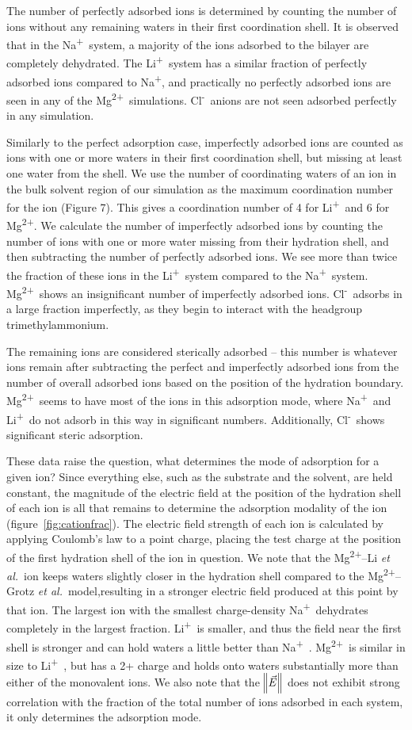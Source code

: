 \documentclass[journal=langd5,manuscript=article]{achemso}
\newcommand{\etal}{\textit{et al.}~}
\newcommand{\na}{Na\textsuperscript{+}~}
\newcommand{\cl}{Cl\textsuperscript{-}~}
\newcommand{\li}{Li\textsuperscript{+}~}
\newcommand{\mg}{Mg\textsuperscript{2+}~}
\newcommand{\mgmbnbfix}{Mg\textsuperscript{2+}--Li \etal} %
\newcommand{\mgmicro}{Mg\textsuperscript{2+}--Grotz \etal}
\begin{document}
The number of perfectly adsorbed ions is determined by counting the number of ions without any remaining 
waters in their first coordination shell. It is observed that in the \na system, a 
majority of the ions adsorbed to the bilayer are completely dehydrated. %
The \li system has a similar fraction of perfectly adsorbed ions compared to Na\textsuperscript{+}, 
and practically no perfectly adsorbed 
ions are seen in any of the \mg simulations. \cl anions are not seen adsorbed perfectly in any simulation.

Similarly to the perfect adsorption case, imperfectly adsorbed ions are counted as ions with one or more waters in their 
first coordination shell, but missing at least one
water from the shell. {We use the number of coordinating waters of an ion in the bulk solvent region
    of our simulation as the maximum coordination number for the ion (Figure 7). This
gives a coordination number of 4 for \li and 6 for 
Mg\textsuperscript{2+}.} We calculate 
{the number of imperfectly adsorbed ions} by counting the number of ions with 
one or more water missing from their hydration shell, and then subtracting the number of perfectly adsorbed ions.
We see more than twice the fraction of these ions in the \li system compared to the \na system. \mg shows an insignificant
number of imperfectly adsorbed ions. \cl adsorbs in a large fraction imperfectly, as they begin to interact with the headgroup trimethylammonium.

The remaining ions are considered sterically adsorbed -- this number is whatever ions remain after subtracting the 
perfect and imperfectly adsorbed ions from the number of overall adsorbed ions based on the position of the hydration boundary. 
\mg seems to have most of the ions in this adsorption mode, where \na and \li do not 
adsorb in this way in significant numbers. Additionally, \cl shows significant steric adsorption.

These data raise the question, what determines the mode of adsorption for a given ion? Since everything else, such as
the substrate and the solvent, are held constant, the magnitude of the electric field at the position of the hydration shell
of each ion is all that remains to determine the adsorption modality of the ion (figure~\ref{fig:cationfrac}).
The electric field strength of each ion is calculated by applying Coulomb's law to a point charge, placing the test charge at the 
position of the first hydration shell of the ion in question. We note that the \mgmbnbfix ion keeps waters slightly closer in the hydration shell
compared to the \mgmicro model{,}{resulting in} a stronger electric field 
produced at this point by that ion.
The largest ion with the smallest charge-density \na dehydrates completely in the largest fraction. \li is smaller, and thus the field near
the first shell is stronger and can hold waters a little better than \na. \mg is similar in size to \li, but has a 2+ charge and
holds onto waters substantially more than either of the monovalent ions.  
We also note that the $\norm{\vec{E}}$ does not exhibit strong correlation with the fraction of the total number of ions adsorbed in each system, it
only determines the adsorption mode. 
\end{document}
